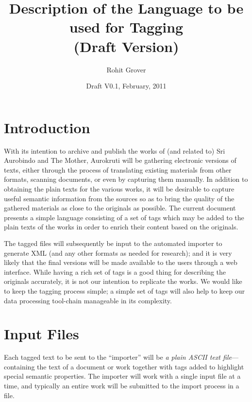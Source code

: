 \documentclass[11pt]{article}
\title{Description of the Language to be used for Tagging\\(Draft Version)}
\author{Rohit Grover}
\date{Draft V0.1, February, 2011}
\begin{document}
\maketitle

\newpage

\section{Introduction}

\noindent With its intention to archive and publish the works of (and
related to) Sri Aurobindo and The Mother, Aurokruti will be gathering
electronic versions of texts, either through the process of
translating existing materials from other formats, scanning documents,
or even by capturing them manually. In addition to obtaining the plain
texts for the various works, it will be desirable to capture useful
semantic information from the sources so as to bring the quality of
the gathered materials as close to the originals as possible. The
current document presents a simple language consisting of a set of
tags which may be added to the plain texts of the works in order to
enrich their content based on the originals.

The tagged files will subsequently be input to the automated importer
to generate XML (and any other formats as needed for research); and it
is very likely that the final versions will be made available to the
users through a web interface. While having a rich set of tags is a
good thing for describing the originals accurately, it is not our
intention to replicate the works. We would like to keep the tagging
process simple; a simple set of tags will also help to keep our data
processing tool-chain manageable in its complexity.



\section{Input Files}

Each tagged text to be sent to the ``importer'' will be {\it a plain
  ASCII text file}---containing the text of a document or work
together with tags added to highlight special semantic properties.
The importer will work with a single input file at a time, and
typically an entire work will be submitted to the import process in a
file.
\end{document}
